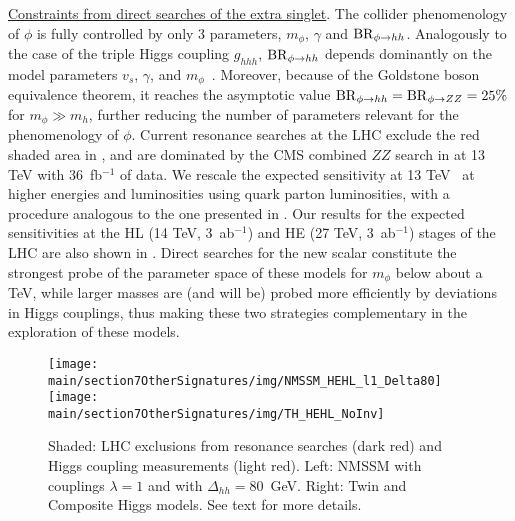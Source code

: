 \underline{Constraints from direct searches of the extra singlet}.
The collider phenomenology of $\phi$ is fully controlled by only 3 parameters, $m_\phi$, $\gamma$ and ${\rm BR}_{\phi \to hh}$. Analogously to the case of the triple Higgs coupling $g_{hhh}$, ${\rm BR}_{\phi \to hh}$ depends dominantly on the model parameters $v_s$, $\gamma$, and $m_\phi$~\cite{Buttazzo:2015bka}. Moreover, because of the Goldstone boson equivalence theorem, it reaches the asymptotic value ${\rm BR}_{\phi \to hh} = {\rm BR}_{\phi \to ZZ} = 25\%$ for $m_\phi \gg m_h$, further reducing the number of parameters relevant for the phenomenology of $\phi$. %
Current resonance searches at the LHC exclude the red shaded area in , and are dominated by the CMS combined $ZZ$ search in  at 13 TeV with 36~fb$^{-1}$ of data. We rescale the expected sensitivity at 13 TeV~\cite{Sirunyan:2018qlb} at higher energies and luminosities using quark parton luminosities, with a procedure analogous to the one presented in . Our results for the expected sensitivities at the HL (14 TeV, 3~ab$^{-1}$) and HE (27 TeV, 3~ab$^{-1}$) stages of the LHC are also shown in .
Direct searches for the new scalar constitute the strongest probe of the parameter space of these models for $m_\phi$ below about a TeV, while larger masses are (and will be) probed more efficiently by deviations in Higgs couplings, thus making these two strategies complementary in the exploration of these  models.

%
\begin{center}
\begin{figure}
\texttt{[image: \\main/section7OtherSignatures/img/NMSSM\_HEHL\_l1\_Delta80]} \;
\texttt{[image: \\main/section7OtherSignatures/img/TH\_HEHL\_NoInv]}
\caption{\label{fig:NMSSM_TH}
Shaded: LHC exclusions from resonance searches (dark red) and Higgs coupling measurements (light red). %
Left: NMSSM with couplings $\lambda = 1$ and with $\Delta_{hh} = 80$~GeV. Right: Twin and Composite Higgs models. %
See text for more details.
}
\end{figure}
\end{center}
%


